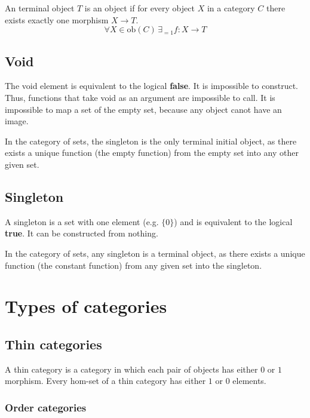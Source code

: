 \documentclass[a4paper]{article}
\begin{document}
An terminal object \(T\) is an object if
for every object \(X\) in a category \(C\)
there exists exactly one morphism \(X\to T\).
\[
    \forall X\in \text{ob}(C) \,\exists_{=1}f:X\to T
\]

\subsection{Void}

The void element is equivalent to the logical \textbf{false}.
It is impossible to construct. Thus, functions that take void
as an argument are impossible to call.
It is impossible to map a set of the empty set, because
any object canot have an image.

In the category of sets, the singleton is the only terminal initial object,
as there exists a unique function (the empty function) from the empty set
into any other given set.

\subsection{Singleton}

A singleton is a set with one element (e.g. \(\{0\}\)) and
is equivalent to the logical \textbf{true}.
It can be constructed from nothing.

In the category of sets, any singleton is a terminal object,
as there exists a unique function (the constant function) from any given
set into the singleton.


\pagebreak

\section{Types of categories}

\subsection{Thin categories}

A thin category is a category in which each pair of objects
has either \(0\) or \(1\) morphism.
Every hom-set of a thin category has either \(1\) or \(0\) elements.

\subsubsection{Order categories}
\end{document}
